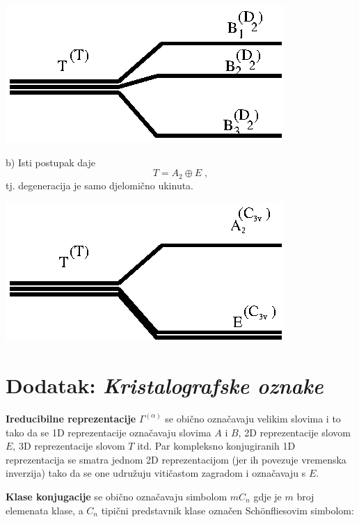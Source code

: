 \begin{primjer}
\centerline{\includegraphics[scale=1.0]{pics/splittingT.eps}}

b) Isti postupak daje
\begin{displaymath}
        T = A_2 \oplus E \;,
\end{displaymath}
tj. degeneracija je samo djelomično ukinuta.

\centerline{\includegraphics[scale=1.0]{pics/splittingT2.eps}}

\end{primjer}

\section{Dodatak: \emph{Kristalografske oznake}}
\label{sec:kristalografija}
\textbf{Ireducibilne reprezentacije} $\Gamma^{(\alpha)}$ se obično označavaju
velikim slovima i to tako da se 1D reprezentacije označavaju slovima
$A$ i $B$, 2D reprezentacije slovom $E$, 3D reprezentacije slovom $T$
itd. Par kompleksno konjugiranih 1D reprezentacija se smatra jednom
2D reprezentacijom (jer ih povezuje vremenska inverzija) tako da se
one udružuju vitičastom zagradom i označavaju s $E$.

\textbf{Klase konjugacije} se obično označavaju simbolom $mC_n$ gdje je $m$
broj elemenata klase, a $C_n$ tipični predstavnik klase označen
Sch\"{o}nfliesovim simbolom:


